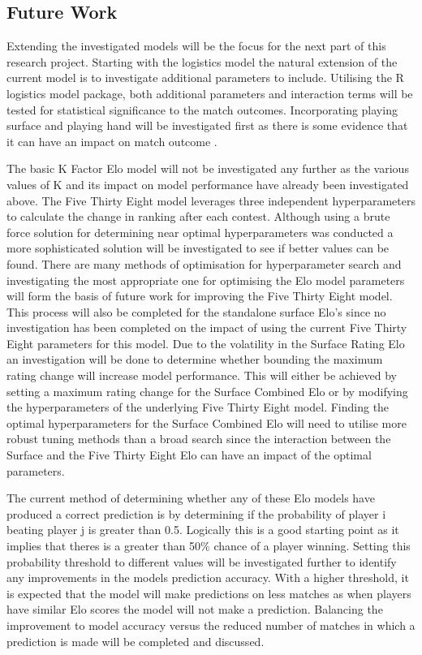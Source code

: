 \documentclass[12pt,a4paper]{article}
\begin{document}
\subsection{Future Work}
Extending the investigated models will be the focus for the next part of this research
project. Starting with the logistics model the natural extension of the current model
is to investigate additional parameters to include. Utilising the R logistics model
package, both additional parameters and interaction terms will be tested for statistical
significance to the match outcomes. Incorporating playing surface and playing hand will
be investigated first as there is some evidence that it can have an impact on match
outcome \cite{loffing_left-handedness_2012}.

The basic K Factor Elo model will not be investigated any further as the various values
of K and its impact on model performance have already been investigated above. The Five
Thirty Eight model leverages three independent hyperparameters to calculate the change
in ranking after each contest. Although using a brute force solution for determining near
optimal hyperparameters was conducted a more sophisticated solution will be investigated to
see if better values can be found. There are many methods of optimisation for
hyperparameter search \cite{claesen_hyperparameter_2015} and investigating the
most appropriate one for optimising the Elo model parameters will form the basis of
future work for improving the Five Thirty Eight model. This process will also be completed
for the standalone surface Elo's since no investigation has been completed on the impact of
using the current Five Thirty Eight parameters for this model.
Due to the volatility in the Surface Rating Elo an investigation will be done to determine
whether bounding the maximum rating change will increase model performance. This will either
be achieved by setting a maximum rating change for the Surface Combined Elo or by modifying
the hyperparameters of the underlying Five Thirty Eight model. Finding the optimal hyperparameters
for the Surface Combined Elo will need to utilise more robust tuning methods than a broad search
since the interaction between the Surface and the Five Thirty Eight Elo can have an impact of the
optimal parameters.

The current method of determining whether any of these Elo models have produced a correct
prediction is by determining if the probability of player i beating player j is greater
than 0.5. Logically this is a good starting point as it implies that theres is a greater
than 50\% chance of a player winning. Setting this probability threshold to different values
will be investigated further to identify any improvements in the models prediction accuracy.
With a higher threshold, it is expected that the model will make predictions on less
matches as when players have similar Elo scores the model will not make a prediction.
Balancing the improvement to model accuracy versus the reduced number of matches in which
a prediction is made will be completed and discussed.
\end{document}
